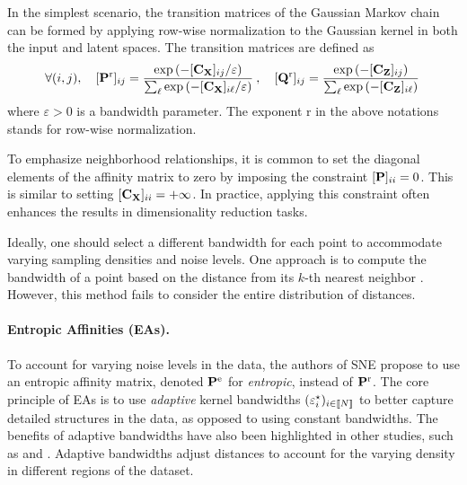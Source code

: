 In the simplest scenario, the transition matrices of the Gaussian Markov chain can be formed by applying row-wise normalization to the Gaussian kernel in both the input and latent spaces. The transition matrices are defined as
\begin{align}
    \forall (i,j), \quad [{\mathbf{P}}^{\mathrm{r}}]_{ij} = \frac{\exp{(-[{\mathbf{C}}_{{\mathbf{X}}}]_{ij} / \varepsilon)}}{\sum_\ell \exp{(-[{\mathbf{C}}_{{\mathbf{X}}}]_{i\ell} / \varepsilon)} } \:, \quad [{\mathbf{Q}}^{\mathrm{r}}]_{ij} = \frac{\exp{(-[{\mathbf{C}}_{{\mathbf{Z}}}]_{ij})}}{\sum_\ell \exp{(-[{\mathbf{C}}_{{\mathbf{Z}}}]_{i\ell})}} \,
\end{align}
where $\varepsilon > 0$ is a bandwidth parameter. The exponent $\mathrm{r}$ in the above notations stands for row-wise normalization.

\begin{remark}
    To emphasize neighborhood relationships, it is common to set the diagonal elements of the affinity matrix to zero by imposing the constraint $[{\mathbf{P}}]_{ii} = 0$. This is similar to setting $[{\mathbf{C}}_{{\mathbf{X}}}]_{ii} = +\infty$. In practice, applying this constraint often enhances the results in dimensionality reduction tasks.
\end{remark}

Ideally, one should select a different bandwidth for each point to accommodate varying sampling densities and noise levels. One approach is to compute the bandwidth of a point based on the distance from its $k$-th nearest neighbor \citep{zelnik2004self}. However, this method fails to consider the entire distribution of distances.

\paragraph{Entropic Affinities (EAs).}
To account for varying noise levels in the data, the authors of SNE propose to use an entropic affinity matrix, denoted ${\mathbf{P}}^{\mathrm{e}}$ for \emph{entropic}, instead of ${\mathbf{P}}^{\mathrm{r}}$. The core principle of EAs \citep{hinton2002stochastic} is to use \emph{adaptive} kernel bandwidths $(\varepsilon^\star_i)_{i \in {[\![N]\!]}}$ to better capture detailed structures in the data, as opposed to using constant bandwidths. The benefits of adaptive bandwidths have also been highlighted in other studies, such as \citep{van2018recovering} and \citep{zelnik2004self}. Adaptive bandwidths adjust distances to account for the varying density in different regions of the dataset.

